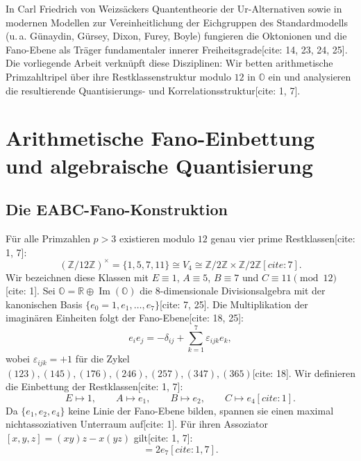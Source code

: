\documentclass[11pt,a4paper]{article}
\theoremstyle{definition}
\theoremstyle{remark}
\begin{document}
In Carl Friedrich von Weizsäckers Quantentheorie der Ur-Alternativen sowie in modernen Modellen zur Vereinheitlichung der Eichgruppen des Standardmodells (u.\,a. Günaydin, Gürsey, Dixon, Furey, Boyle) fungieren die Oktonionen und die Fano-Ebene als Träger fundamentaler innerer Freiheitsgrade[cite: 14, 23, 24, 25]. Die vorliegende Arbeit verknüpft diese Disziplinen: Wir betten arithmetische Primzahltripel über ihre Restklassenstruktur modulo $12$ in $\mathbb{O}$ ein und analysieren die resultierende Quantisierungs- und Korrelationsstruktur[cite: 1, 7].

\section{Arithmetische Fano-Einbettung und algebraische Quantisierung}

\subsection{Die EABC-Fano-Konstruktion}
Für alle Primzahlen $p > 3$ existieren modulo $12$ genau vier prime Restklassen[cite: 1, 7]:
\begin{equation}
(\mathbb{Z}/12\mathbb{Z})^\times = \{1, 5, 7, 11\} \cong V_4 \cong \mathbb{Z}/2\mathbb{Z} \times \mathbb{Z}/2\mathbb{Z}[cite: 7].
\end{equation}
Wir bezeichnen diese Klassen mit $E \equiv 1$, $A \equiv 5$, $B \equiv 7$ und $C \equiv 11 \pmod{12}$[cite: 1]. Sei $\mathbb{O} = \mathbb{R} \oplus \operatorname{Im}(\mathbb{O})$ die 8-dimensionale Divisionsalgebra mit der kanonischen Basis $\{e_0 = 1, e_1, \dots, e_7\}$[cite: 7, 25]. Die Multiplikation der imaginären Einheiten folgt der Fano-Ebene[cite: 18, 25]:
\begin{equation}
e_i e_j = -\delta_{ij} + \sum_{k=1}^7 \varepsilon_{ijk} e_k,
\end{equation}
wobei $\varepsilon_{ijk} = +1$ für die Zykel $(123), (145), (176), (246), (257), (347), (365)$[cite: 18]. Wir definieren die Einbettung der Restklassen[cite: 1, 7]:
\begin{equation}
E \mapsto 1, \qquad A \mapsto e_1, \qquad B \mapsto e_2, \qquad C \mapsto e_4[cite: 1].
\end{equation}
Da $\{e_1, e_2, e_4\}$ keine Linie der Fano-Ebene bilden, spannen sie einen maximal nichtassoziativen Unterraum auf[cite: 1]. Für ihren Assoziator $[x, y, z] = (xy)z - x(yz)$ gilt[cite: 1, 7]:
\begin{equation}
[e_1, e_2, e_4] = 2e_7[cite: 1, 7].
\end{equation}
\end{document}
